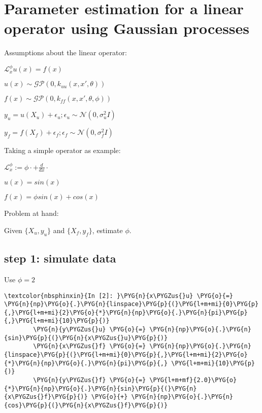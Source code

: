 \documentclass[letterpaper,10pt,english]{sphinxmanual}
\begin{document}
\chapter{Parameter estimation for a linear operator using Gaussian processes}
\label{\detokenize{report/4-par_est:Parameter-estimation-for-a-linear-operator-using-Gaussian-processes}}\label{\detokenize{report/4-par_est::doc}}
Assumptions about the linear operator:

\(\mathcal{L}_x^\phi u(x) = f(x)\)

\(u(x) \sim \mathcal{GP}(0, k_{uu}(x,x',\theta))\)

\(f(x) \sim \mathcal{GP}(0, k_{ff}(x,x',\theta,\phi))\)

\(y_u = u(X_u) + \epsilon_u; \epsilon_u \sim \mathcal{N}(0, \sigma_u^2I)\)

\(y_f = f(X_f) + \epsilon_f; \epsilon_f \sim \mathcal{N}(0, \sigma_f^2I)\)

Taking a simple operator as example:

\(\mathcal{L}_x^\phi := \phi \cdot + \frac{d}{dx}\cdot\)

\(u(x) = sin(x)\)

\(f(x) = \phi sin(x) + cos(x)\)

Problem at hand:

Given \(\{X_u, y_u\}\) and \(\{X_f, y_f\}\), estimate
\(\phi\).


\section{step 1: simulate data}
\label{\detokenize{report/4-par_est:step-1:-simulate-data}}
Use \(\phi = 2\)

%
\begin{Verbatim}[commandchars=\\\{\}]
\textcolor{nbsphinxin}{In [2]: }\PYG{n}{x\PYGZus{}u} \PYG{o}{=} \PYG{n}{np}\PYG{o}{.}\PYG{n}{linspace}\PYG{p}{(}\PYG{l+m+mi}{0}\PYG{p}{,}\PYG{l+m+mi}{2}\PYG{o}{*}\PYG{n}{np}\PYG{o}{.}\PYG{n}{pi}\PYG{p}{,}\PYG{l+m+mi}{10}\PYG{p}{)}
        \PYG{n}{y\PYGZus{}u} \PYG{o}{=} \PYG{n}{np}\PYG{o}{.}\PYG{n}{sin}\PYG{p}{(}\PYG{n}{x\PYGZus{}u}\PYG{p}{)}
        \PYG{n}{x\PYGZus{}f} \PYG{o}{=} \PYG{n}{np}\PYG{o}{.}\PYG{n}{linspace}\PYG{p}{(}\PYG{l+m+mi}{0}\PYG{p}{,}\PYG{l+m+mi}{2}\PYG{o}{*}\PYG{n}{np}\PYG{o}{.}\PYG{n}{pi}\PYG{p}{,} \PYG{l+m+mi}{10}\PYG{p}{)}
        \PYG{n}{y\PYGZus{}f} \PYG{o}{=} \PYG{l+m+mf}{2.0}\PYG{o}{*}\PYG{n}{np}\PYG{o}{.}\PYG{n}{sin}\PYG{p}{(}\PYG{n}{x\PYGZus{}f}\PYG{p}{)} \PYG{o}{+} \PYG{n}{np}\PYG{o}{.}\PYG{n}{cos}\PYG{p}{(}\PYG{n}{x\PYGZus{}f}\PYG{p}{)}
\end{Verbatim}
\end{document}
